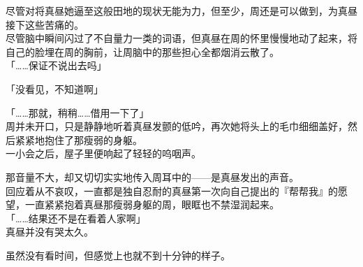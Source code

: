 尽管对将真昼她逼至这般田地的现状无能为力，但至少，周还是可以做到，为真昼接下这些苦痛的。\\

尽管脑中瞬间闪过了不自量力一类的词语，但真昼在周的怀里慢慢地动了起来，将自己的脸埋在周的胸前，让周脑中的那些担心全都烟消云散了。\\

「……保证不说出去吗」

「没看见，不知道啊」

「……那就，稍稍……借用一下了」\\

周并未开口，只是静静地听着真昼发颤的低吟，再次她将头上的毛巾细细盖好，然后紧紧地抱住了那瘦弱的身躯。\\

一小会之后，屋子里便响起了轻轻的呜咽声。

那音量不大，却又切切实实地传入周耳中的——是真昼发出的声音。\\

回应着从不哀叹，一直都是独自忍耐的真昼第一次向自己提出的『帮帮我』的愿望，一直紧紧抱着真昼那瘦弱身躯的周，眼眶也不禁湿润起来。\\



「……结果还不是在看着人家啊」\\

真昼并没有哭太久。

虽然没有看时间，但感觉上也就不到十分钟的样子。\\

